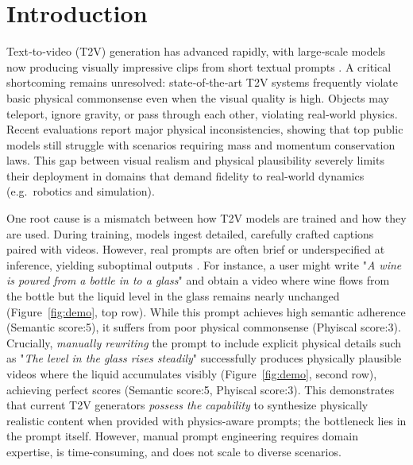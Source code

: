 \section{Introduction}
\label{sec:intro}
Text‑to‑video (T2V) generation has advanced rapidly, with large‑scale
models now producing visually impressive clips from short textual
prompts \cite{zheng2024open, yang2024cogvideox, chen2024videocrafter2, wang2025wan}.
A critical shortcoming remains unresolved: state‑of‑the‑art
T2V systems frequently violate basic physical commonsense even when the
visual quality is high.
Objects may teleport, ignore gravity, or pass
through each other, violating real‑world physics.
Recent evaluations \cite{meng2024towards, bansal2024videophy, Bansal2025} report major physical inconsistencies, showing that top
public models still struggle with scenarios requiring mass and momentum conservation laws.
This gap between visual realism and physical plausibility severely limits their deployment in domains that demand fidelity to real‑world dynamics (e.g.\ robotics and simulation).

One root cause is a mismatch between how T2V models are trained and how they are used. During training, models ingest detailed, carefully crafted captions paired with videos. However, real prompts are often brief or underspecified at inference, yielding suboptimal outputs \cite{xue2024phyt2v, cheng2025vpo}.
For instance, a user might write "\textit{A wine is poured from a bottle in to a glass}" and obtain a video where wine flows from the bottle but the liquid level in the glass remains nearly unchanged (Figure~\ref{fig:demo}, top row). While this prompt achieves high semantic adherence (Semantic score:5), it suffers from poor physical commonsense (Phyiscal score:3). Crucially, \emph{manually rewriting} the prompt to include explicit physical details such as "\textit{The level in the glass rises steadily}" successfully produces physically plausible videos where the liquid accumulates visibly (Figure~\ref{fig:demo}, second row), achieving perfect scores (Semantic score:5, Phyiscal score:3). This demonstrates that current T2V generators \emph{possess the capability} to synthesize physically realistic content when provided with physics-aware prompts; the bottleneck lies in the prompt itself. However, manual prompt engineering requires domain expertise, is time-consuming, and does not scale to diverse scenarios.

